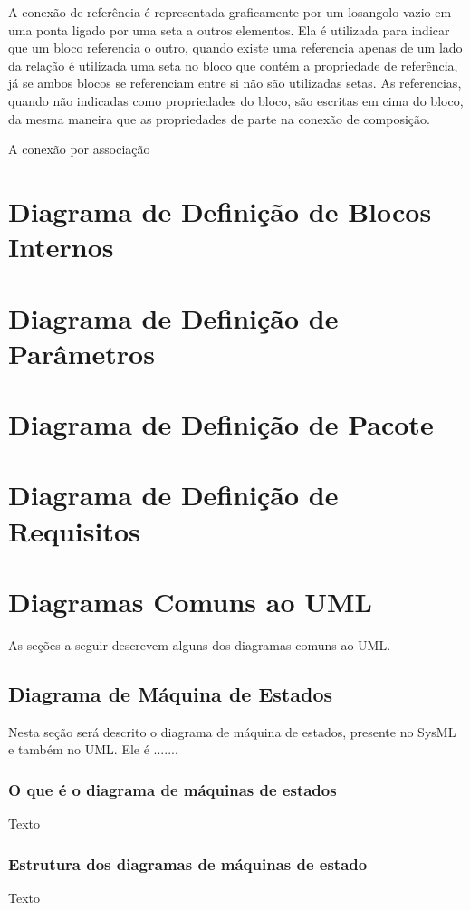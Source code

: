 A conexão de referência é representada graficamente por um losangolo vazio em uma ponta ligado por uma seta a outros elementos. Ela é utilizada para indicar que um bloco referencia o outro, quando existe uma referencia apenas de um lado da relação é utilizada uma seta no bloco que contém a propriedade de referência, já se ambos blocos se referenciam entre si não são utilizadas setas. As referencias, quando não indicadas como propriedades do bloco, são escritas em cima do bloco, da mesma maneira que as propriedades de parte na conexão de composição. 

A conexão por associação 



\section{Diagrama de Definição de Blocos Internos}
\section{Diagrama de Definição de Parâmetros}
\section{Diagrama de Definição de Pacote}
\section{Diagrama de Definição de Requisitos}
\section{Diagramas Comuns ao UML}
As seções a seguir descrevem alguns dos diagramas comuns ao UML.

\subsection{Diagrama de Máquina de Estados}
Nesta seção será descrito o diagrama de máquina de estados, presente no SysML e também no UML. Ele é .......

\subsubsection{O que é o diagrama de máquinas de estados}
Texto

\subsubsection{Estrutura dos diagramas de máquinas de estado}
Texto

